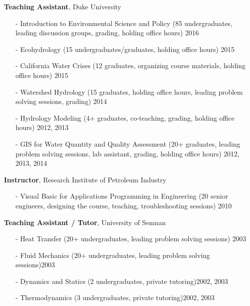 \documentclass[10pt]{article}
\newenvironment{changemargin}[2]{%
  \begin{list}{}{%
    \setlength{\topsep}{0pt}%
    \setlength{\leftmargin}{#1}%
    \setlength{\rightmargin}{#2}%
    \setlength{\listparindent}{\parindent}%
    \setlength{\itemindent}{\parindent}%
    \setlength{\parsep}{\parskip}%
  }%
  \item[]}{\end{list}
}
\newenvironment{body} {
	\vspace*{-2pt}
	\begin{changemargin}{-0.5in}{-0.5in}
  }
	{\end{changemargin}
}
\begin{document}
\begin{body}
  \textbf {Teaching Assistant}, Duke University\\
	\vspace*{-4pt}
		\begin{itemize} \itemsep -0pt
  		\item[-]Introduction to Environmental Science and Policy (85 undergraduates, leading discussion groups, grading, holding office hours) \hfill {2016}
  		\item[-]Ecohydrology (15 undergraduates/graduates, holding office hours) \hfill {2015}
  		\item[-]California Water Crises (12 graduates, organizing course materials, holding office hours) \hfill {2015}
  		\item[-]Watershed Hydrology (15 graduates, holding office hours, leading problem solving sessions, grading) \hfill {2014}
  		\item[-]Hydrology Modeling (4+ graduates, co-teaching, grading, holding office hours) \hfill {2012, 2013}
  		\item[-]GIS for Water Quantity and Quality Assessment (20+ graduates, leading problem solving sessions, lab assistant, grading, holding office hours) \hfill {2012, 2013, 2014}
  	\end{itemize}

\medskip

	\textbf {Instructor}, Research Institute of Petroleum Industry\\
	\vspace*{-4pt}
			\begin{itemize} \itemsep -0pt
    	  \item[-]Visual Basic for Applications Programming in Engineering (20 senior engineers, designing the course, teaching,  troubleshooting sessions)  \hfill {2010}
    	\end{itemize}
\medskip

	\textbf {Teaching Assistant / Tutor}, University of Semnan \\
		\vspace*{-4pt}
		\begin{itemize} \itemsep -0pt
        \item[-]Heat Transfer  (20+ undergraduates,  leading problem solving sessions) \hfill {2003}
        \item[-]Fluid Mechanics  (20+ undergraduates,  leading problem solving sessions)\hfill {2003}
        \item[-]Dynamics and Statics (2 undergraduates, private tutoring)\hfill {2002, 2003}
        \item[-]Thermodynamics  (3 undergraduates, private tutoring)\hfill {2002, 2003}
    	\end{itemize}
\medskip

\end{body}
\medskip
\end{document}
